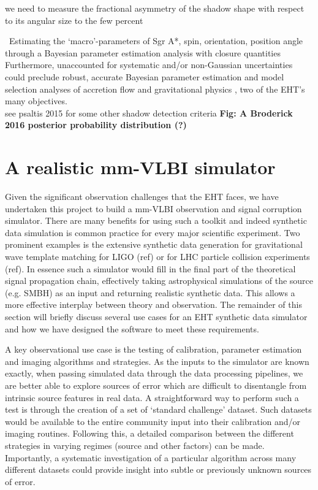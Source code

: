 
we need to measure the fractional
asymmetry of the shadow shape with respect to its angular size to the few percent


~Estimating the `macro'-parameters of Sgr A*, spin, orientation, position angle through a Bayesian parameter estimation analysis with closure quantities\\
Furthermore, unaccounted for systematic and/or non-Gaussian uncertainties could preclude robust, accurate Bayesian parameter estimation and model selection analyses of accretion flow \citep[e.g.][]{Broderick_2016} and gravitational physics \citep[e.g.][]{Broderick_2014, Psaltis_2016}, two of the EHT's many objectives.
~\\
see psaltis 2015 for  some other shadow detection criteria
\textbf{Fig: A Broderick 2016 posterior probability distribution (?)}


\section{A realistic mm-VLBI simulator}

Given the significant observation challenges that the EHT faces, we have undertaken this project to build a mm-VLBI observation and signal corruption simulator.  There are many benefits for using such a toolkit and indeed synthetic data simulation is common practice for every major scientific experiment. Two prominent examples is the  extensive synthetic data generation for gravitational wave template matching for LIGO (ref) or for LHC particle collision experiments (ref). In essence such a simulator would fill in the final part of the theoretical signal propagation chain, effectively taking  astrophysical simulations of the source (e.g. SMBH) as an input and returning realistic synthetic data. This allows a more effective interplay between theory and observation. The remainder of this section will briefly discuss several use cases for an EHT synthetic data simulator and how we have designed the software to meet these requirements. 


A key observational use case is the testing of calibration, parameter estimation and imaging algorithms and strategies. As the inputs to the simulator are known exactly, when passing simulated data through the data processing pipelines, we are better able to explore sources of error which are difficult to disentangle from intrinsic source features in real data.  A straightforward way to perform such a test is through the creation of a set of `standard challenge' dataset. Such datasets would be available to the entire community input into their calibration and/or imaging routines. Following this, a detailed comparison between the different strategies in varying regimes (source and other factors) can be made. Importantly, a systematic investigation of a particular algorithm across many different datasets could provide insight into subtle or previously unknown sources of error.

